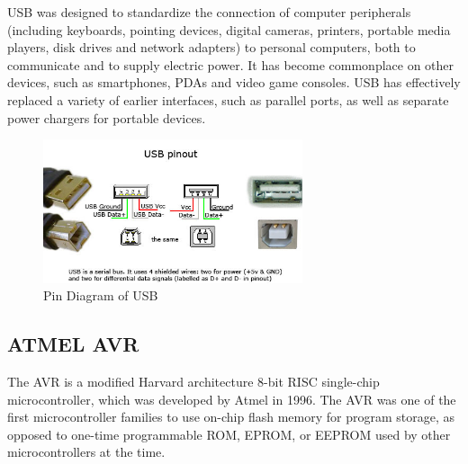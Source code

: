 \documentclass[12pt]{article}
\begin{document}
USB was designed to standardize the connection of computer peripherals (including keyboards, pointing devices, digital cameras, printers, portable media players, disk drives and network adapters) to personal computers, both to communicate and to supply electric power. It has become commonplace on other devices, such as smartphones, PDAs and video game consoles. USB has effectively replaced a variety of earlier interfaces, such as parallel ports, as well as separate power chargers for portable devices.\par 
\begin{figure}[!h]
\includegraphics[width=3in]{usb}
\centering
\caption{Pin Diagram of USB}
\end{figure}
\subsection{ATMEL AVR}
The AVR is a modified Harvard architecture 8-bit RISC single-chip microcontroller, which was developed by Atmel in 1996. The AVR was one of the first microcontroller families to use on-chip flash memory for program storage, as opposed to one-time programmable ROM, EPROM, or EEPROM used by other microcontrollers at the time.\par 
\end{document}
